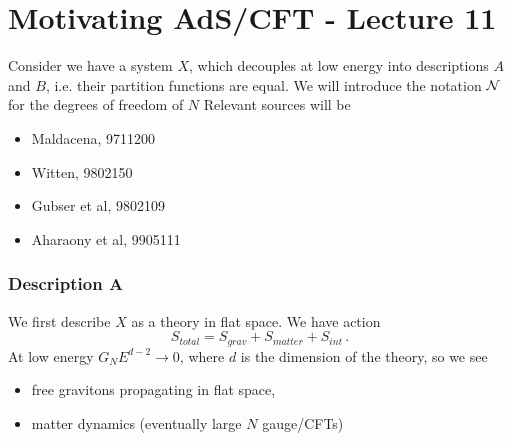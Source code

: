 \documentclass{article}
\begin{document}
\section{Motivating AdS/CFT - Lecture 11}
Consider we have a system $X$, which decouples at low energy into descriptions $A$ and $B$, i.e. their partition functions are equal. We will introduce the notation $\mathcal{N}$ for the degrees of freedom of $N$
Relevant sources will be 
\begin{itemize}
	\item Maldacena, 9711200
	\item Witten, 9802150
	\item Gubser et al, 9802109
	\item Aharaony et al, 9905111
\end{itemize} 
\subsubsection{Description A}
We first describe $X$ as a theory in flat space. We have action
\[
S_{total} = S_{grav} + S_{matter} + S_{int} \, .
\]
At low energy $G_N E^{d-2} \to 0$, where $d$ is the dimension of the theory, so we see 
\begin{itemize}
	\item free gravitons propagating in flat space,
	\item matter dynamics (eventually large $N$ gauge/CFTs)
\end{itemize}

\end{document}
